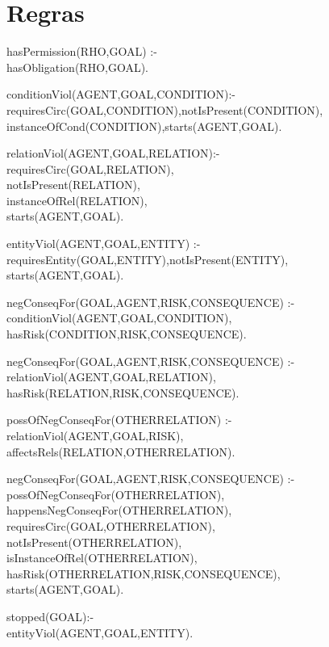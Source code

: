 \section{Regras}

hasPermission(RHO,GOAL) :- \\ hasObligation(RHO,GOAL).

conditionViol(AGENT,GOAL,CONDITION):- \\ requiresCirc(GOAL,CONDITION),notIsPresent(CONDITION), \\ instanceOfCond(CONDITION),starts(AGENT,GOAL).

relationViol(AGENT,GOAL,RELATION):- \\ requiresCirc(GOAL,RELATION), \\ notIsPresent(RELATION), \\  instanceOfRel(RELATION), \\starts(AGENT,GOAL).

entityViol(AGENT,GOAL,ENTITY) :- \\requiresEntity(GOAL,ENTITY),notIsPresent(ENTITY), \\ starts(AGENT,GOAL).

negConseqFor(GOAL,AGENT,RISK,CONSEQUENCE) :- \\ conditionViol(AGENT,GOAL,CONDITION), \\ hasRisk(CONDITION,RISK,CONSEQUENCE).

negConseqFor(GOAL,AGENT,RISK,CONSEQUENCE) :- \\ relationViol(AGENT,GOAL,RELATION), \\hasRisk(RELATION,RISK,CONSEQUENCE).

possOfNegConseqFor(OTHERRELATION) :- \\ relationViol(AGENT,GOAL,RISK), \\ affectsRels(RELATION,OTHERRELATION).

negConseqFor(GOAL,AGENT,RISK,CONSEQUENCE) :- \\ possOfNegConseqFor(OTHERRELATION), \\ happensNegConseqFor(OTHERRELATION), \\ requiresCirc(GOAL,OTHERRELATION), \\ notIsPresent(OTHERRELATION), \\ isInstanceOfRel(OTHERRELATION), \\ hasRisk(OTHERRELATION,RISK,CONSEQUENCE), \\ starts(AGENT,GOAL).

stopped(GOAL):- \\ entityViol(AGENT,GOAL,ENTITY).

